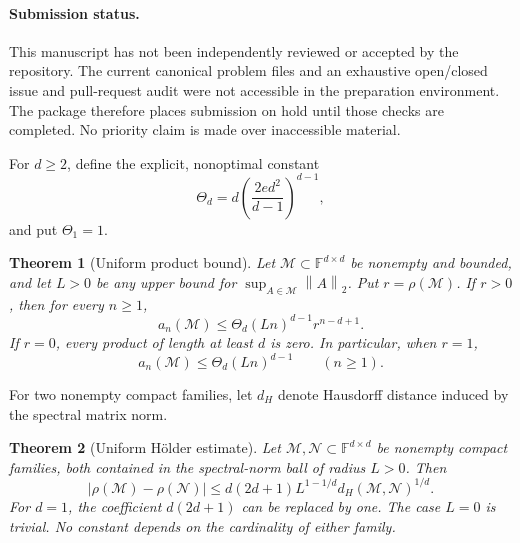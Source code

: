 \documentclass[11pt]{article}
\newtheorem{theorem}{Theorem}
\theoremstyle{remark}\newtheorem{remark}[theorem]{Remark}
\newcommand{\F}{\mathbb F}
\newcommand{\norm}[1]{\left\lVert #1\right\rVert_2}
\begin{document}
\paragraph{Submission status.}
This manuscript has not been independently reviewed or accepted by the repository. The current canonical problem files and an exhaustive open/closed issue and pull-request audit were not accessible in the preparation environment. The package therefore places submission on hold until those checks are completed. No priority claim is made over inaccessible material.

For $d\geq2$, define the explicit, nonoptimal constant
\[
 \Theta_d=d\left(\frac{2ed^2}{d-1}\right)^{d-1},
\]
and put $\Theta_1=1$.

\begin{theorem}[Uniform product bound]\label{thm:growth}
Let $\mathcal M\subset\F^{d\times d}$ be nonempty and bounded, and let $L>0$ be any upper bound for $\sup_{A\in\mathcal M}\norm A$. Put $r=\rho(\mathcal M)$.
If $r>0$, then for every $n\geq1$,
\begin{equation}\label{eq:general-growth}
 a_n(\mathcal M)\leq\Theta_d(Ln)^{d-1}r^{n-d+1}.
\end{equation}
If $r=0$, every product of length at least $d$ is zero.
In particular, when $r=1$,
\begin{equation}\label{eq:radius-one-growth}
 a_n(\mathcal M)\leq\Theta_d(Ln)^{d-1}\qquad(n\geq1).
\end{equation}
\end{theorem}

For two nonempty compact families, let $d_H$ denote Hausdorff distance induced by the spectral matrix norm.
\begin{theorem}[Uniform H\"older estimate]\label{thm:holder}
Let $\mathcal M,\mathcal N\subset\F^{d\times d}$ be nonempty compact families, both contained in the spectral-norm ball of radius $L>0$. Then
\begin{equation}\label{eq:holder}
 |\rho(\mathcal M)-\rho(\mathcal N)|
 \leq d(2d+1)L^{1-1/d}d_H(\mathcal M,\mathcal N)^{1/d}.
\end{equation}
For $d=1$, the coefficient $d(2d+1)$ can be replaced by one. The case $L=0$ is trivial. No constant depends on the cardinality of either family.
\end{theorem}
\end{document}
